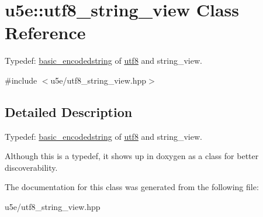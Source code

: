 \hypertarget{classu5e_1_1utf8__string__view}{}\section{u5e\+:\+:utf8\+\_\+string\+\_\+view Class Reference}
\label{classu5e_1_1utf8__string__view}


Typedef\+: \hyperlink{classu5e_1_1basic__encodedstring}{basic\+\_\+encodedstring} of \hyperlink{classu5e_1_1utf8}{utf8} and string\+\_\+view.  




{\ttfamily \#include $<$u5e/utf8\+\_\+string\+\_\+view.\+hpp$>$}



\subsection{Detailed Description}
Typedef\+: \hyperlink{classu5e_1_1basic__encodedstring}{basic\+\_\+encodedstring} of \hyperlink{classu5e_1_1utf8}{utf8} and string\+\_\+view. 

Although this is a typedef, it shows up in doxygen as a class for better discoverability. 

The documentation for this class was generated from the following file\+:\begin{DoxyCompactItemize}
\item 
u5e/utf8\+\_\+string\+\_\+view.\+hpp\end{DoxyCompactItemize}
